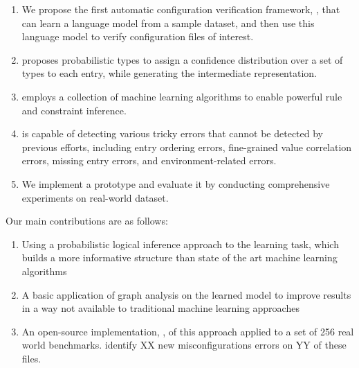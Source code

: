 

\begin{enumerate}

\item We propose the first automatic configuration verification
framework, \app, that can learn a language model from a sample
dataset, and then use this language model to verify 
configuration files of interest.
 
\item \app proposes probabilistic types to assign a confidence 
distribution over a set of types to each entry, 
while generating the intermediate representation. 

\item \app employs a collection of machine learning algorithms to 
enable powerful rule and constraint inference.

\item \app is capable of detecting various tricky errors that cannot
be detected by previous efforts,
including entry ordering errors, fine-grained value correlation errors, 
missing entry errors, and environment-related errors. 

\item We implement a \app prototype and evaluate it by
conducting comprehensive experiments on real-world dataset.

\end{enumerate}

Our main contributions are as follows:

\begin{enumerate}

\item Using a probabilistic logical inference approach to the learning task, which builds a more informative structure than state of the art machine learning algorithms
 
\item A basic application of graph analysis on the learned model to improve results in a way not available to traditional machine learning approaches 

\item An open-source implementation, \app, of this approach applied to a set of 256 real world benchmarks. \app identify XX new misconfigurations errors on YY of these files.
\end{enumerate}
